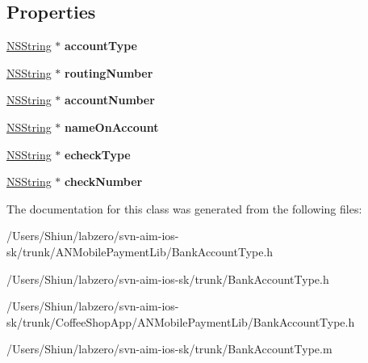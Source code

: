 \subsection*{Properties}
\begin{DoxyCompactItemize}
\item 
\hypertarget{interface_bank_account_type_ac4d66836d669f547966b55fcdbaff27f}{
\hyperlink{class_n_s_string}{NSString} $\ast$ {\bfseries accountType}}
\label{interface_bank_account_type_ac4d66836d669f547966b55fcdbaff27f}

\item 
\hypertarget{interface_bank_account_type_a0a6a465f16428bcb0b804f2d7891efd3}{
\hyperlink{class_n_s_string}{NSString} $\ast$ {\bfseries routingNumber}}
\label{interface_bank_account_type_a0a6a465f16428bcb0b804f2d7891efd3}

\item 
\hypertarget{interface_bank_account_type_a1082120e0c734e794a4ab17fc3352468}{
\hyperlink{class_n_s_string}{NSString} $\ast$ {\bfseries accountNumber}}
\label{interface_bank_account_type_a1082120e0c734e794a4ab17fc3352468}

\item 
\hypertarget{interface_bank_account_type_a651f524729e77654b19c8d2a0afc4728}{
\hyperlink{class_n_s_string}{NSString} $\ast$ {\bfseries nameOnAccount}}
\label{interface_bank_account_type_a651f524729e77654b19c8d2a0afc4728}

\item 
\hypertarget{interface_bank_account_type_acd1d1e78b68ca0463d8c4317aab3bd85}{
\hyperlink{class_n_s_string}{NSString} $\ast$ {\bfseries echeckType}}
\label{interface_bank_account_type_acd1d1e78b68ca0463d8c4317aab3bd85}

\item 
\hypertarget{interface_bank_account_type_a10790dcff8a7486e53d9a945a0aa3594}{
\hyperlink{class_n_s_string}{NSString} $\ast$ {\bfseries checkNumber}}
\label{interface_bank_account_type_a10790dcff8a7486e53d9a945a0aa3594}

\end{DoxyCompactItemize}


The documentation for this class was generated from the following files:\begin{DoxyCompactItemize}
\item 
/Users/Shiun/labzero/svn-\/aim-\/ios-\/sk/trunk/ANMobilePaymentLib/BankAccountType.h\item 
/Users/Shiun/labzero/svn-\/aim-\/ios-\/sk/trunk/BankAccountType.h\item 
/Users/Shiun/labzero/svn-\/aim-\/ios-\/sk/trunk/CoffeeShopApp/ANMobilePaymentLib/BankAccountType.h\item 
/Users/Shiun/labzero/svn-\/aim-\/ios-\/sk/trunk/BankAccountType.m\end{DoxyCompactItemize}
